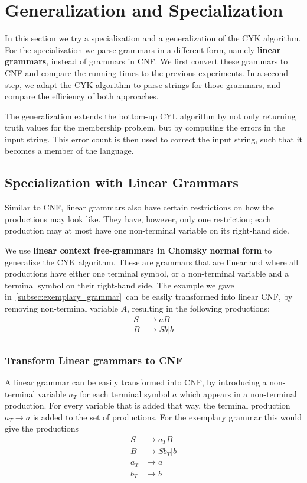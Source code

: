 \section{Generalization and Specialization}
\label{sec:specialization}

In this section we try a specialization and a generalization of the CYK algorithm.
For the specialization we parse grammars in a different form, namely \textbf{linear grammars}, instead of grammars in CNF.
We first convert these grammars to CNF and compare the running times to the previous experiments.
In a second step, we adapt the CYK algorithm to parse strings for those grammars, and compare the efficiency of both approaches.

The generalization extends the bottom-up CYL algorithm by not only returning truth values for the membership problem, but by computing the errors in the input string.
This error count is then used to correct the input string, such that it becomes a member of the language.

\subsection{Specialization with Linear Grammars}
Similar to CNF, linear grammars also have certain restrictions on how the productions may look like.
They have, however, only one restriction; each production may at most have one non-terminal variable on its right-hand side.

We use \textbf{linear context free-grammars in Chomsky normal form} to generalize the CYK algorithm.
These are grammars that are linear and where all productions have either one terminal symbol, or a non-terminal variable and a terminal symbol on their right-hand side.
The example we gave in~\cref{subsec:exemplary_grammar}~can be easily transformed into linear CNF, by removing non-terminal variable $A$, resulting in the following productions:
\begin{align*}
    S&\rightarrow aB \\
    B&\rightarrow Sb|b \\
\end{align*}


\subsubsection{Transform Linear grammars to CNF}
A linear grammar can be easily transformed into CNF, by introducing a non-terminal variable $a_T$ for each terminal symbol $a$ which appears in a non-terminal production.
For every variable that is added that way, the terminal production $a_T\rightarrow a$ is added to the set of productions.
For the exemplary grammar this would give the productions
\begin{align*}
    S&\rightarrow a_T B \\
    B&\rightarrow Sb_T|b \\
    a_T&\rightarrow a \\
    b_T&\rightarrow b
\end{align*}

